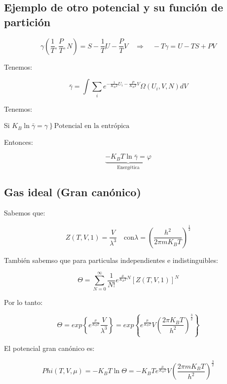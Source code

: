\documentclass{article}
\begin{document}
 \subsection{Ejemplo de otro potencial y su función de partición }



\[  \gamma\left(  \frac{1}{T}, \frac{P}{T}, N  \right) = S - \frac{1}{T}U - \frac{P}{T}V \quad \Rightarrow \quad -T\gamma = U - TS +PV \]


Tenemos:


\[  \bar{\gamma} = \int\limits \sum\limits_{i} e^{  - \frac{1  }{ K_{B}T } U_{i} - \frac{P}{K_{B}T} V  } \Omega(U_{i},V,N) dV    \]



Tenemos:

Si $\left. K_{B}\ln{\bar{\gamma}} = \gamma \right\} \text{Potencial en la entrópica}  $


Entonces:


\[ \underbrace{-K_{B}T\ln{\bar{\gamma}} = \varphi}_{\text{Energética}}  \]

\subsection{Gas ideal (Gran canónico)}

Sabemos que:


\[ Z(T,V,1) = \frac{V}{\lambda^{3}} \quad \text{con}  \lambda = \left( \frac{ h^{2} }{2\pi m K_{B}T}    \right)^{\frac{1}{2}}  \]



También sabemso que para particulas independientes e indistinguibles:


\[    \Theta = \sum\limits_{N=0}^{\infty} \frac{1}{N!} e^{ \frac{ \mu  }{ K_{B}T }N   } \left[  Z(T,V,1)   \right]^{N}       \]

Por lo tanto:

\[ \Theta = exp \left\{ e^{\frac{ \mu }{K_{B}T  }} \frac{ V  }{\lambda^{3}}    \right\} = exp\left\{  e^{  \frac{ \mu }{K_{B}T  }  } V \left(  \frac{2\pi K_{B}T  }{h^{2}}  \right)^{\frac{3}{2}} \right\}    \]



El potencial gran canónico es:




\[ Phi(T,V,\mu) = -K_{B}T \ln \Theta = -K_{B}Te^{ \frac{ \mu }{K_{B}T}  } V \left( \frac{2\pi m K_{B}T}{h^{2}}   \right)^{ \frac{3}{2} } \]
\end{document}
